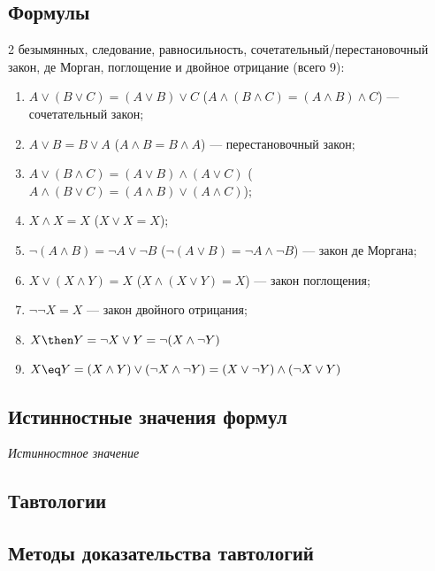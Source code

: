 \subsection{Формулы}
2 безымянных, следование, равносильность, сочетательный/перестановочный закон, де Морган, поглощение и двойное отрицание (всего 9):
\begin{enumerate}
    \item $A \lor (B \lor C) = (A \lor B) \lor C$ \Big($A \land (B \land C) = (A \land B) \land C$\Big) --- сочетательный закон;
    \item $A \lor B = B \lor A$ \Big($A \land B = B \land A$\Big) --- перестановочный закон;
    \item $A \lor (B \land C) = (A \lor B) \land (A \lor C)$ \Big($A \land (B \lor C) = (A \land B) \lor (A \land C)$\Big);
    \item $X \land X = X$ \Big($X \lor X = X$\Big);
    \item $\lnot(A \land B) = \lnot A \lor \lnot B$ \Big($\lnot(A \lor B) = \lnot A \land \lnot B$\Big) --- закон де Моргана;
    \item $X \lor (X \land Y) = X$ \Big($X \land (X \lor Y) = X$\Big) --- закон поглощения;
    \item $\lnot \lnot X = X$ --- закон двойного отрицания;
    \item $X \then Y = \lnot X \lor Y = \lnot (X \land \lnot Y)$
    \item $X \eq Y = (X \land Y) \lor (\lnot X \land \lnot Y) = (X \lor \lnot Y) \land (\lnot X \lor Y)$
\end{enumerate}
\subsection{Истинностные значения формул}
\dftion \textit{Истинностное значение }
\subsection{Тавтологии}
\subsection{Методы доказательства тавтологий}